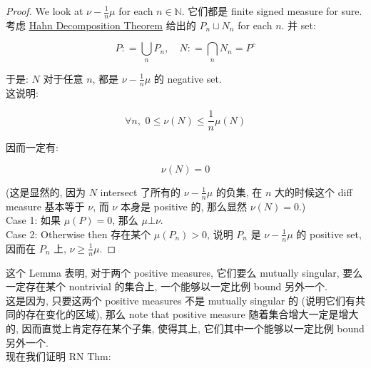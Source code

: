 \documentclass{qlnotes-export}
\begin{document}
\begin{proof}

We look at \(\nu - \frac{1}{n}\mu\) for each \(n \in {\mathbb{N}}\). 它们都是 finite signed measure for sure.\\
考虑 \href{https://qiulinfan.github.io/notes/math/measure-theory/\#kn-hahn-decomposition-theorem}{Hahn Decomposition Theorem} 给出的 \(P_{n} \sqcup N_{n}\) for each \(n\). 并 set:

\[P: = \bigcup\limits_{n}P_{n},\quad N: = \bigcap\limits_{n}N_{n} = P^{c}\]

于是: \(N\) 对于任意 \(n\), 都是 \(\nu - \frac{1}{n}\mu\) 的 negative set.\\
这说明:

\[\forall n,\,\, 0 \leq \nu(N) \leq \frac{1}{n}\mu(N)\]

因而一定有:

\[\nu(N) = 0\]

(这是显然的, 因为 \(N\) intersect 了所有的 \(\nu - \frac{1}{n}\mu\) 的负集, 在 \(n\) 大的时候这个 diff measure 基本等于 \(\nu\), 而 \(\nu\) 本身是 positive 的, 那么显然 \(\nu(N) = 0\).)\\
Case 1: 如果 \(\mu(P) = 0\), 那么 \(\mu\bot\nu\).\\
Case 2: Otherwise then 存在某个 \(\mu(P_{n}) > 0\), 说明 \(P_{n}\) 是 \(\nu - \frac{1}{n}\mu\) 的 positive set, 因而在 \(P_{n}\) 上, \(\nu \geq \frac{1}{n}\mu\).

\end{proof}

这个 Lemma 表明, 对于两个 positive measures, 它们要么 mutually singular, 要么一定存在某个 nontrivial 的集合上, 一个能够以一定比例 bound 另外一个.\\
这是因为, 只要这两个 positive measures 不是 mutually singular 的 (说明它们有共同的存在变化的区域), 那么 note that positive measure 随着集合增大一定是增大的, 因而直觉上肯定存在某个子集, 使得其上, 它们其中一个能够以一定比例 bound 另外一个.\\
现在我们证明 RN Thm:
\end{document}
